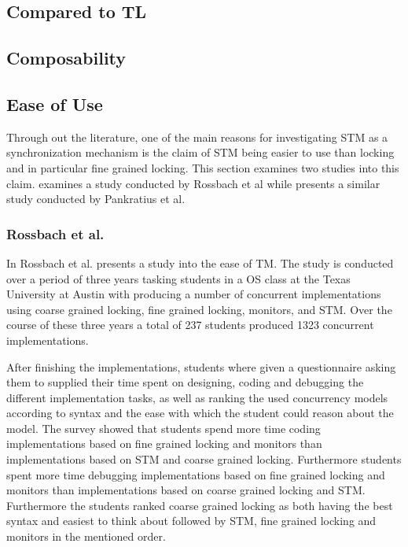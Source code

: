 \subsection{Compared to TL}

\subsection{Composability}
\subsection{Ease of Use}
Through out the literature, one of the main reasons for investigating \ac{STM} as a synchronization mechanism is the claim of \ac{STM} being easier to use than locking and in particular fine grained locking. This section examines two studies into this claim.  examines a study conducted by Rossbach et al while  presents a similar study conducted by Pankratius et al.
\subsubsection{Rossbach et al.}
\label{sec:stm_ease_rossbach}
In \cite{rossbach2010transactional} Rossbach et al. presents a study into the ease of \ac{TM}. The study is conducted over a period of three years tasking students in a \ac{OS} class at the Texas University at Austin with producing a number of concurrent implementations using coarse grained locking, fine grained locking, monitors, and \ac{STM}. Over the course of these three years a total of 237 students produced 1323 concurrent implementations. 

After finishing the implementations, students where given a questionnaire asking them to supplied their time spent on designing, coding and debugging the different implementation tasks, as well as ranking the used concurrency models according to syntax and the ease with which the student could reason about the model. The survey showed that students spend more time coding implementations based on fine grained locking and monitors than implementations based on \ac{STM} and coarse grained locking\cite[p. 51]{rossbach2010transactional}. Furthermore students spent more time debugging implementations based on fine grained locking and monitors than implementations based on coarse grained locking and \ac{STM}\cite[p. 51]{rossbach2010transactional}. Furthermore the students ranked coarse grained locking as both having the best syntax and easiest to think about followed by \ac{STM}, fine grained locking and monitors in the mentioned order.

